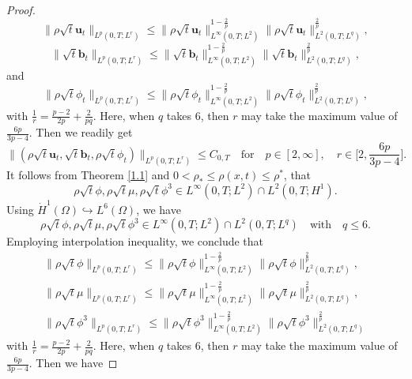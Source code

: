 \documentclass[10pt,a4paper]{amsart}
\begin{document}
\begin{proof}
\begin{equation*}
\|\rho\sqrt{t}\mathbf{u}_t\|_{L^p(0,T;L^r)} \leq \|\rho\sqrt{t}\mathbf{u}_t\|_{L^\infty(0,T;L^2)}^{1 - \frac{2}{p}} \|\rho\sqrt{t}\mathbf{u}_t\|_{L^2(0,T;L^q)}^{\frac{2}{p}},
\end{equation*}
\begin{equation*}
\|\sqrt{t}\mathbf{b}_t\|_{L^p(0,T;L^r)} \leq \|\sqrt{t}\mathbf{b}_t\|_{L^\infty(0,T;L^2)}^{1 - \frac{2}{p}} \|\sqrt{t}\mathbf{b}_t\|_{L^2(0,T;L^q)}^{\frac{2}{p}},
\end{equation*}
and
\begin{equation*}
\|\rho\sqrt{t}\phi_t\|_{L^p(0,T;L^r)} \leq \|\rho\sqrt{t}\phi_t\|_{L^\infty(0,T;L^2)}^{1 - \frac{2}{p}} \|\rho\sqrt{t}\phi_t\|_{L^2(0,T;L^q)}^{\frac{2}{p}},
\end{equation*}
with \(\frac{1}{r} = \frac{p - 2}{2p} + \frac{2}{pq}\). Here, when \(q\) takes \(6\), then \(r\) may take the maximum value of \(\frac{6p}{3p - 4}\). Then we readily get
\begin{equation}
\|(\rho\sqrt{t}\mathbf{u}_t, \sqrt{t}\mathbf{b}_t, \rho\sqrt{t}\phi_t)\|_{L^p(0,T;L^r)} \leq C_{0,T} \quad \text{for} \quad p \in [2,\infty], \quad r \in \Big[2, \frac{6p}{3p - 4}\Big].\label{eq-11}
\end{equation}
It follows from Theorem \ref{1.1} and $0<\rho_* \leq \rho(x, t) \leq \rho^*$, that
\begin{equation*}
\rho\sqrt{t}\phi, \rho\sqrt{t}\mu, \rho\sqrt{t}\phi^3 \in L^\infty(0,T;L^2) \cap L^2(0,T;H^1).
\end{equation*}
Using $\dot{H}^1(\Omega) \hookrightarrow L^6(\Omega)$, we have
\begin{equation*}
\rho\sqrt{t}\phi, \rho\sqrt{t}\mu, \rho\sqrt{t}\phi^3 \in L^\infty(0,T;L^2) \cap L^2(0,T;L^q) \quad \text{with} \quad q \leq 6.
\end{equation*}
Employing  interpolation inequality, we conclude that
\begin{align*}
\|\rho\sqrt{t}\phi\|_{L^p(0,T;L^r)} \leq \|\rho\sqrt{t}\phi\|_{L^\infty(0,T;L^2)}^{1 - \frac{2}{p}} \|\rho\sqrt{t}\phi\|_{L^2(0,T;L^q)}^{\frac{2}{p}},\\
\|\rho\sqrt{t}\mu\|_{L^p(0,T;L^r)} \leq \|\rho\sqrt{t}\mu\|_{L^\infty(0,T;L^2)}^{1 - \frac{2}{p}} \|\rho\sqrt{t}\mu\|_{L^2(0,T;L^q)}^{\frac{2}{p}},\\
\|\rho\sqrt{t}\phi^3\|_{L^p(0,T;L^r)} \leq \|\rho\sqrt{t}\phi^3\|_{L^\infty(0,T;L^2)}^{1 - \frac{2}{p}} \|\rho\sqrt{t}\phi^3\|_{L^2(0,T;L^q)}^{\frac{2}{p}}
\end{align*}
with \(\frac{1}{r} = \frac{p - 2}{2p} + \frac{2}{pq}\). Here, when \(q\) takes \(6\), then \(r\) may take the maximum value of \(\frac{6p}{3p - 4}\). Then we have

\end{proof}
\end{document}
